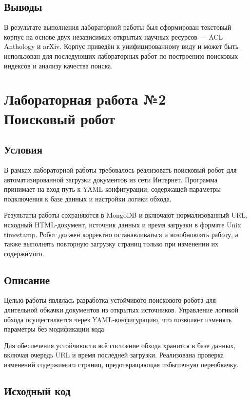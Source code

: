 \documentclass[12pt,a4paper]{article}
\begin{document}
\subsection*{Выводы}

В результате выполнения лабораторной работы был сформирован текстовый корпус на основе двух независимых открытых научных ресурсов — ACL Anthology и arXiv. Корпус приведён к унифицированному виду и может быть использован для последующих лабораторных работ по построению поисковых индексов и анализу качества поиска.

\newpage

\section*{Лабораторная работа №2\\
Поисковый робот}

\subsection*{Условия}

В рамках лабораторной работы требовалось реализовать поисковый робот для автоматизированной загрузки документов из сети Интернет. Программа принимает на вход путь к YAML-конфигурации, содержащей параметры подключения к базе данных и настройки логики обхода.

Результаты работы сохраняются в MongoDB и включают нормализованный URL, исходный HTML-документ, источник данных и время загрузки в формате Unix timestamp. Робот должен корректно останавливаться и возобновлять работу, а также выполнять повторную загрузку страниц только при изменении их содержимого.

\subsection*{Описание}

Целью работы являлась разработка устойчивого поискового робота для длительной обкачки документов из открытых источников. Управление логикой обхода осуществляется через YAML-конфигурацию, что позволяет изменять параметры без модификации кода.

Для обеспечения устойчивости всё состояние обхода хранится в базе данных, включая очередь URL и время последней загрузки. Реализована проверка изменений содержимого страниц, предотвращающая избыточную переобкачку.

\subsection*{Исходный код}
\end{document}
